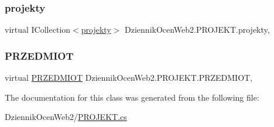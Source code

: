 \subsubsection{\texorpdfstring{projekty}{projekty}}
{\footnotesize\ttfamily virtual I\+Collection$<$\hyperlink{class_dziennik_ocen_web2_1_1projekty}{projekty}$>$ Dziennik\+Ocen\+Web2.\+P\+R\+O\+J\+E\+K\+T.\+projekty\hspace{0.3cm}{\ttfamily [get]}, {\ttfamily [set]}}

\mbox{\label{class_dziennik_ocen_web2_1_1_p_r_o_j_e_k_t_aa9a826689c26127e29cc455b9cd9518d}} 
\subsubsection{\texorpdfstring{P\+R\+Z\+E\+D\+M\+I\+OT}{PRZEDMIOT}}
{\footnotesize\ttfamily virtual \hyperlink{class_dziennik_ocen_web2_1_1_p_r_z_e_d_m_i_o_t}{P\+R\+Z\+E\+D\+M\+I\+OT} Dziennik\+Ocen\+Web2.\+P\+R\+O\+J\+E\+K\+T.\+P\+R\+Z\+E\+D\+M\+I\+OT\hspace{0.3cm}{\ttfamily [get]}, {\ttfamily [set]}}



The documentation for this class was generated from the following file\+:\begin{DoxyCompactItemize}
\item 
Dziennik\+Ocen\+Web2/\hyperlink{_p_r_o_j_e_k_t_8cs}{P\+R\+O\+J\+E\+K\+T.\+cs}\end{DoxyCompactItemize}
